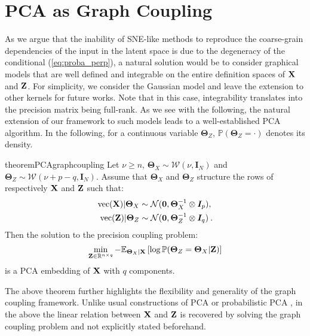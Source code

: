 \section{PCA as Graph Coupling}\label{sec:pca_graph_coupling}


As we argue that the inability of SNE-like methods to reproduce the coarse-grain dependencies of the input in the latent space is due to the degeneracy of the conditional (\ref{eq:proba_perp}), a natural solution would be to consider graphical models that are well defined and integrable on the entire definition spaces of $\mathbf{X}$ and $\mathbf{Z}$. For simplicity, we consider the Gaussian model and leave the extension to other kernels for future works. Note that in this case, integrability translates into the precision matrix being full-rank. As we see with the following, the natural extension of our framework to such models leads to a well-established PCA algorithm. In the following, for a continuous variable $\bm{\Theta}_{Z}$, $\mathbb{P}(\bm{\Theta}_{Z} = \cdot)$ denotes its density.

\begin{restatable}{theorem}{PCAgraphcoupling}
\label{PCA_graph_coupling}
Let $\nu \geq n$,  $\bm{\Theta}_{X} \sim \mathcal{W}(\nu, \bm{I}_N)$ and $\bm{\Theta}_{Z} \sim \mathcal{W}(\nu + p - q, \bm{I}_N)$. Assume that $\bm{\Theta}_{X}$ and $\bm{\Theta}_{Z}$ structure the rows of respectively $\mathbf{X}$ and $\mathbf{Z}$ such that: 
\begin{align}
    \mathrm{vec}(\mathbf{X}) | \bm{\Theta}_{X} &\sim \mathcal{N}(\bm{0}, \bm{\Theta}_{X}^{-1} \otimes \bm{I}_p), \label{eq:X_given_theta} \\
    \mathrm{vec}(\mathbf{Z}) | \bm{\Theta}_{Z} &\sim \mathcal{N}(\bm{0}, \bm{\Theta}_{Z}^{-1} \otimes \bm{I}_q) \label{eq:Z_given_theta} \:.
\end{align}
Then the solution to the precision coupling problem:
\begin{align*}
    \min_{\mathbf{Z} \in \mathbb{R}^{n \times q}} -\mathbb{E}_{\bm{\Theta}_{X} | \mathbf{X}}\left[\log \mathbb{P}(\bm{\Theta}_{Z}=\bm{\Theta}_{X}|\mathbf{Z})\right]
\end{align*}
is a PCA embedding of $\mathbf{X}$ with $q$ components.
\end{restatable}

The above theorem further highlights the flexibility and generality of the graph coupling framework. Unlike usual constructions of PCA or probabilistic PCA \citep{tipping1999probabilistic}, in the above the linear relation between $\mathbf{X}$ and $\mathbf{Z}$ is recovered by solving the graph coupling problem and not explicitly stated beforehand. 

